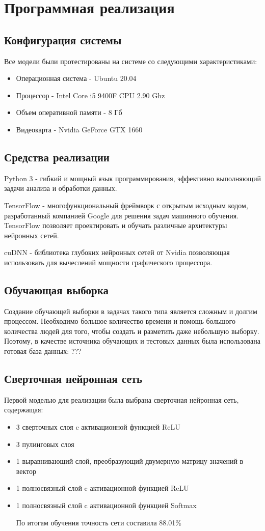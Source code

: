 \section{Программная реализация}

\subsection{Конфигурация системы}
Все модели были протестированы на системе со следующими характеристиками:
\begin{itemize}
  \item Операционная система - Ubuntu 20.04
  \item Процессор - Intel Core i5 9400F CPU 2.90 Ghz
  \item Объем оперативной памяти - 8 Гб
  \item Видеокарта - Nvidia GeForce GTX 1660
\end{itemize}

\subsection{Средства реализации}
Python 3 - гибкий и мощный язык программирования, эффективно выполняющий задачи анализа и обработки данных. 

TensorFlow - многофункциональный фреймворк с открытым исходным кодом, разработанный компанией Google для решения задач машинного обучения. TensorFlow позволяет проектировать и обучать различные архитектуры нейронных сетей.

cuDNN - библиотека глубоких нейронных сетей от Nvidia позволяющая использовать для вычеслений мощности графического процессора. 
\subsection{Обучающая выборка}
Создание обучающей выборки в задачах такого типа является сложным
и долгим процессом. Необходимо большое количество времени и помощь
большого количества людей для того, чтобы создать и разметить
даже небольшую выборку.
Поэтому, в качестве источника обучающих и тестовых данных была использована готовая база данных: ??? 

\subsection{Сверточная нейронная сеть}
Первой моделью для реализации была выбрана сверточная нейронная сеть, содержащая:
\begin{itemize}
  \item 3 сверточных слоя c активационной функцией ReLU
  \item 3 пулинговых слоя
  \item 1 выравнивающий слой, преобразующий двумерную матрицу значений в вектор
  \item 1 полносвязный слой c активационной функцией ReLU
  \item 1 полносвязный слой c активационной функцией Softmax

  По итогам обучения точность сети составила 88.01\% \\
  
\end{itemize}
